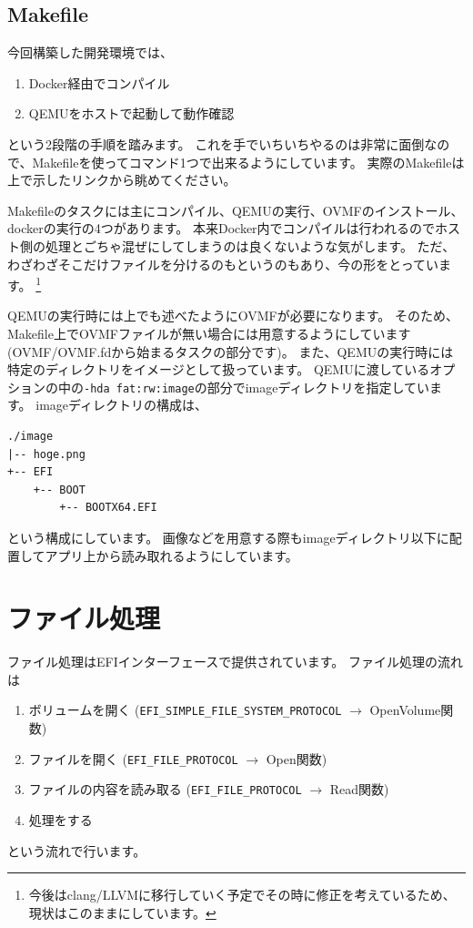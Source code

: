 \documentclass[10pt,b5paper,twoside,openany]{ltjsbook}
\begin{document}
\subsection{Makefile}
今回構築した開発環境では、
\begin{enumerate}
    \item Docker経由でコンパイル
    \item QEMUをホストで起動して動作確認
\end{enumerate}
という2段階の手順を踏みます。
これを手でいちいちやるのは非常に面倒なので、Makefileを使ってコマンド1つで出来るようにしています。
実際のMakefileは上で示したリンクから眺めてください。

Makefileのタスクには主にコンパイル、QEMUの実行、OVMFのインストール、dockerの実行の4つがあります。
本来Docker内でコンパイルは行われるのでホスト側の処理とごちゃ混ぜにしてしまうのは良くないような気がします。
ただ、わざわざそこだけファイルを分けるのもというのもあり、今の形をとっています。
\footnote{今後はclang/LLVMに移行していく予定でその時に修正を考えているため、現状はこのままにしています。}

QEMUの実行時には上でも述べたようにOVMFが必要になります。
そのため、Makefile上でOVMFファイルが無い場合には用意するようにしています(OVMF/OVMF.fdから始まるタスクの部分です)。
また、QEMUの実行時には特定のディレクトリをイメージとして扱っています。
QEMUに渡しているオプションの中の\verb+-hda fat:rw:image+の部分でimageディレクトリを指定しています。
imageディレクトリの構成は、
\begin{verbatim}
./image
|-- hoge.png
+-- EFI
    +-- BOOT
        +-- BOOTX64.EFI
\end{verbatim}
という構成にしています。
画像などを用意する際もimageディレクトリ以下に配置してアプリ上から読み取れるようにしています。

\section{ファイル処理}
ファイル処理はEFIインターフェースで提供されています。
ファイル処理の流れは
\begin{enumerate}
    \item ボリュームを開く (\verb+EFI_SIMPLE_FILE_SYSTEM_PROTOCOL+ $\rightarrow$ OpenVolume関数)
    \item ファイルを開く (\verb+EFI_FILE_PROTOCOL+ $\rightarrow$ Open関数)
    \item ファイルの内容を読み取る (\verb+EFI_FILE_PROTOCOL+ $\rightarrow$ Read関数)
    \item 処理をする
\end{enumerate}
という流れで行います。
\end{document}
